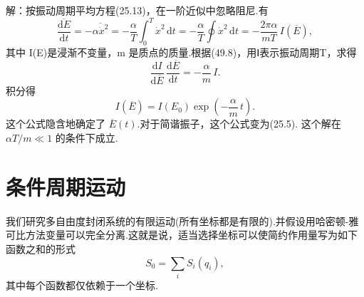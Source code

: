 \begin{xiti}
解：按振动周期平均方程(25.13)，在一阶近似中忽略阻尼.有
\begin{equation*}
  \overline{\frac{\mathrm{d}E}{\mathrm{d}t}}
  =-\overline{\alpha\dot{x}^2}
  =-\frac{\alpha}{T}\int_0^T\dot{x}^2\,\mathrm{d}t
  =-\frac{\alpha}{T}\oint\dot{x}^2\,\mathrm{d}t
  =-\frac{2\pi\alpha}{mT}\,I(\overline{E}),
\end{equation*}
其中 I(E)是浸渐不变量，m 是质点的质量.根据(49.8)，用Ⅰ表示振动周期T，求得
\begin{equation*}
  \frac{\mathrm{d}I}{\mathrm{d}\overline{E}}\,
  \frac{\mathrm{d}\overline{E}}{\mathrm{d}t}=-\frac{\alpha}{m}\,I.
\end{equation*}
积分得
\begin{equation*}
  I(\overline{E})=I(E_0)\exp\left(-\frac{\alpha}{m}\,t\right).
\end{equation*}
这个公式隐含地确定了 $\overline{E}(t)$.对于简谐振子，这个公式变为(25.5).
这个解在 $\alpha T/m\ll 1$ 的条件下成立.

\end{xiti}

\section{条件周期运动}

我们研究多自由度封闭系统的有限运动(所有坐标都是有限的).并假设用哈密顿-雅可比方法变量可以完全分离.这就是说，适当选择坐标可以使简约作用量写为如下函数之和的形式
\begin{equation}
  S_0=\sum_i S_i(q_i),
\end{equation}
其中每个函数都仅依赖于一个坐标.


